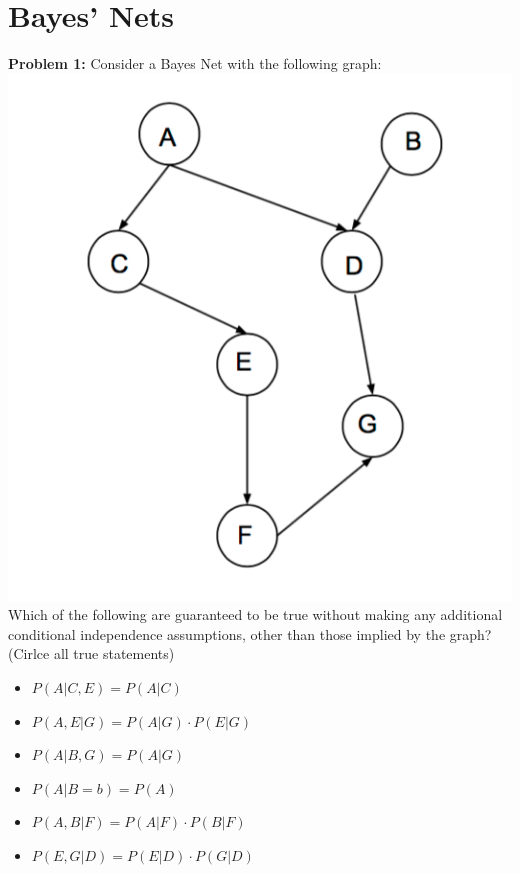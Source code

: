 \documentclass[a4paper]{article}
\newif\ifsol
\begin{document}
\section{Bayes' Nets}
    \textbf{Problem 1:} Consider a Bayes Net with the following graph:\\
    \includegraphics[scale=0.65]{figs/net1.png}\\
    Which of the following are guaranteed to be true without making any additional conditional independence assumptions, other than those implied by the graph? (Cirlce all true statements)
    \begin{itemize}
        \item \ifsol {\color{blue} $P(A|C,E)=P(A|C)$}
              \else $P(A|C,E)=P(A|C)$
              \fi
        \item $P(A,E|G)=P(A|G) \cdot P(E|G)$
        \item $P(A|B,G)=P(A|G)$
        \item \ifsol {\color{blue} $P(A|B=b)=P(A)$}
              \else $P(A|B=b)=P(A)$
              \fi
        \item \ifsol {\color{blue} $P(A,B|F)=P(A|F) \cdot P(B|F)$}
              \else $P(A,B|F)=P(A|F) \cdot P(B|F)$
              \fi
        \item $P(E,G|D)=P(E|D) \cdot P(G|D)$
    \end{itemize}
\end{document}
